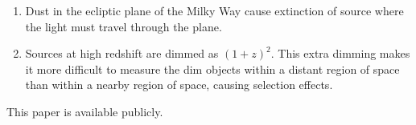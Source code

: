 \documentclass{paper}
\begin{document}
\begin{enumerate}
\begin{enumerate}
        \item
          Dust in the ecliptic plane of the Milky Way cause extinction of 
          source where the light must travel through the plane.

        \item
          Sources at high redshift are dimmed as \((1+z)^2\). This extra 
          dimming makes it more difficult to measure the dim objects within
          a distant region of space than within a nearby region of space,
          causing selection effects.

      \end{enumerate}


\end{enumerate}

This paper is available publicly.\cite{Hayden_Cosmology_Source_Repo}

\pagebreak
\printbibliography
\end{document}

